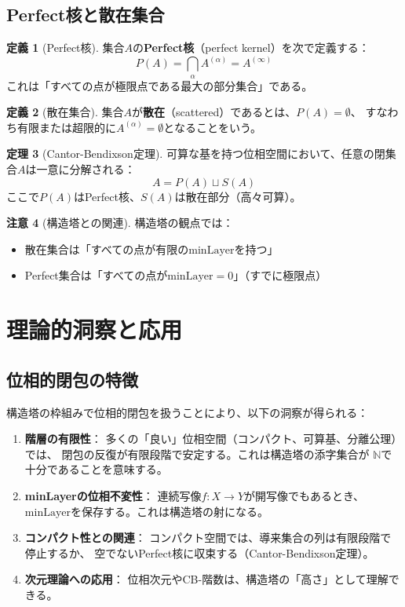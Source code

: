 \documentclass[a4paper,12pt]{ltjsarticle}
\theoremstyle{definition}
\newtheorem{definition}{定義}[section]
\newtheorem{theorem}[definition]{定理}
\newtheorem{remark}[definition]{注意}
\begin{document}
\subsection{Perfect核と散在集合}

\begin{definition}[Perfect核]
集合$A$の\textbf{Perfect核}（perfect kernel）を次で定義する：
\[
P(A) = \bigcap_{\alpha} A^{(\alpha)} = A^{(\infty)}
\]
これは「すべての点が極限点である最大の部分集合」である。
\end{definition}

\begin{definition}[散在集合]
集合$A$が\textbf{散在}（scattered）であるとは、$P(A) = \emptyset$、
すなわち有限または超限的に$A^{(\alpha)} = \emptyset$となることをいう。
\end{definition}

\begin{theorem}[Cantor-Bendixson定理]
可算な基を持つ位相空間において、任意の閉集合$A$は一意に分解される：
\[
A = P(A) \sqcup S(A)
\]
ここで$P(A)$はPerfect核、$S(A)$は散在部分（高々可算）。
\end{theorem}

\begin{remark}[構造塔との関連]
構造塔の観点では：
\begin{itemize}
\item 散在集合は「すべての点が有限の$\mathrm{minLayer}$を持つ」
\item Perfect集合は「すべての点が$\mathrm{minLayer} = 0$」（すでに極限点）
\end{itemize}
\end{remark}

\section{理論的洞察と応用}

\subsection{位相的閉包の特徴}

構造塔の枠組みで位相的閉包を扱うことにより、以下の洞察が得られる：

\begin{enumerate}
\item \textbf{階層の有限性}：
  多くの「良い」位相空間（コンパクト、可算基、分離公理）では、
  閉包の反復が有限段階で安定する。これは構造塔の添字集合が
  $\mathbb{N}$で十分であることを意味する。

\item \textbf{minLayerの位相不変性}：
  連続写像$f: X \to Y$が開写像でもあるとき、
  $\mathrm{minLayer}$を保存する。これは構造塔の射になる。

\item \textbf{コンパクト性との関連}：
  コンパクト空間では、導来集合の列は有限段階で停止するか、
  空でないPerfect核に収束する（Cantor-Bendixson定理）。

\item \textbf{次元理論への応用}：
  位相次元やCB-階数は、構造塔の「高さ」として理解できる。
\end{enumerate}
\end{document}
